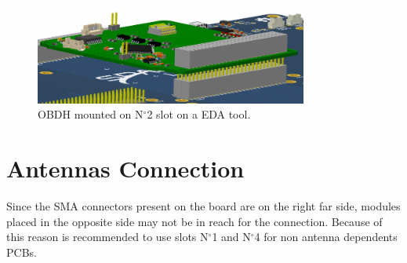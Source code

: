 \begin{figure}[!ht]
    \begin{center}
        \includegraphics[width=0.8\textwidth]{figures/obdh2_mouting.png}
        \caption{OBDH mounted on N$^{\circ}$2 slot on a EDA tool.}
        \label{fig:obdh2-mouting}
    \end{center}
\end{figure}

\section{Antennas Connection}

Since the SMA connectors present on the board are on the right far side, modules placed in the opposite side may not be in reach for the connection. Because of this reason is recommended to use slots N$^{\circ}$1 and N$^{\circ}$4 for non antenna dependents PCBs.
